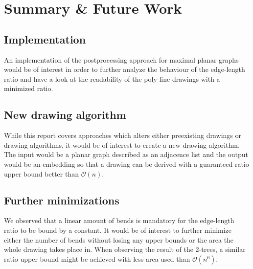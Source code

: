 \section{Summary \& Future Work}
\subsection{Implementation}
An implementation of the postprocessing approach for maximal planar graphs would be of interest in order to further analyze the behaviour of the edge-length ratio and have a look at the readability of the poly-line drawings with a minimized ratio.
\subsection{New drawing algorithm}
While this report covers approaches which alters either preexisting drawings or drawing algorithms, it would be of interest to create a new drawing algorithm. The input would be a planar graph described as an adjacence list and the output would be an embedding so that a drawing can be derived with a guaranteed ratio upper bound better than $\mathcal{O}(n)$.
\subsection{Further minimizations}
We observed that a linear amount of bends is mandatory for the edge-length ratio to be bound by a constant. It would be of interest to further minimize either the number of bends without losing any upper bounds or the area the whole drawing takes place in. When observing the result of the 2-trees, a similar ratio upper bound might be achieved with less area used than $\mathcal{O}(n^6)$.